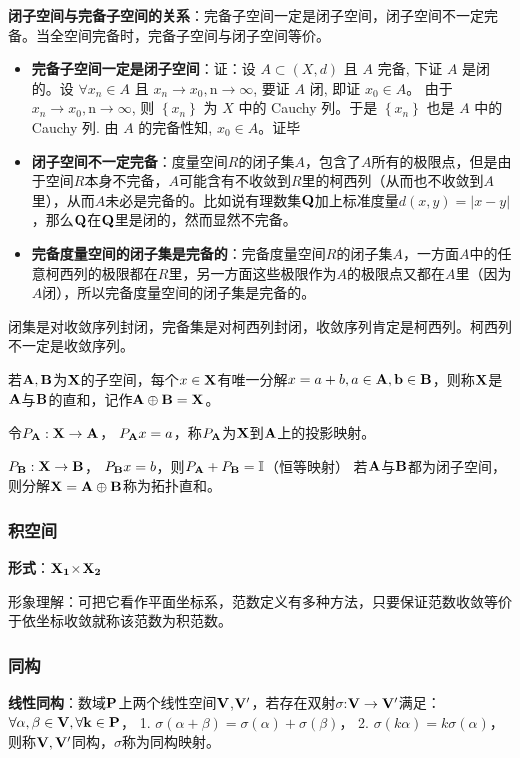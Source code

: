 \documentclass[12pt,a4paper]{article}
\begin{document}
\textbf{闭子空间与完备子空间的关系}：完备子空间一定是闭子空间，闭子空间不一定完备。当全空间完备时，完备子空间与闭子空间等价。
\begin{itemize}
  \item \textbf{完备子空间一定是闭子空间}：证：设 $A \subset(X, d)$ 且 $A$ 完备, 下证 $A$ 是闭的。设 $\forall x_{n} \in A$ 且 $x_{n} \rightarrow x_{0}, \mathrm{n} \rightarrow \infty$, 要证 $A$ 闭, 即证 $x_{0} \in A$。 由于 $x_{n} \rightarrow x_{0}, \mathrm{n} \rightarrow \infty$, 则 $\left\{x_{n}\right\}$ 为 $X$ 中的 Cauchy 列。于是 $\left\{x_{n}\right\}$ 也是 $A$ 中的 Cauchy 列. 由 $A$ 的完备性知, $x_{0} \in A$。证毕
  \item \textbf{闭子空间不一定完备}：度量空间$R$的闭子集$A$，包含了$A$所有的极限点，但是由于空间$R$本身不完备，$A$可能含有不收敛到$R$里的柯西列（从而也不收敛到$A$里），从而$A$未必是完备的。比如说有理数集$\bf{Q}$加上标准度量$d(x,y)=|x-y|$，那么$\bf{Q}$在$\bf{Q}$里是闭的，然而显然不完备。
  \item \textbf{完备度量空间的闭子集是完备的}：完备度量空间$R$的闭子集$A$，一方面$A$中的任意柯西列的极限都在$R$里，另一方面这些极限作为$A$的极限点又都在$A$里（因为$A$闭），所以完备度量空间的闭子集是完备的。
\end{itemize}
闭集是对收敛序列封闭，完备集是对柯西列封闭，收敛序列肯定是柯西列。柯西列不一定是收敛序列。

若$\bf{A},\bf{B}$为$\bf{X}$的子空间，每个$x\in{\bf{X}}$有唯一分解$x=a+b,a\in\bf{A},b\in{\bf{B}}$，则称$\bf{X}$是$\bf{A}$与$\bf{B}$的直和，记作$\bf{A}\oplus \bf{B}=\bf{X}$。

令$P_{\bf{A}}:\bf{X}\rightarrow \bf{A}$， $P_{\bf{A}}x=a$，称$P_{\bf{A}}$为$\bf{X}$到$\bf{A}$上的投影映射。

$P_{\bf{B}}:\bf{X}\rightarrow \bf{B}$， $P_{\bf{B}}x=b$，则$P_{\bf{A}}+P_{\bf{B}}=\mathbb{I}$（恒等映射）
若$\bf{A}$与$\bf{B}$都为闭子空间，则分解$\bf{X}=\bf{A}\oplus\bf{B}$称为拓扑直和。

\subsubsection{积空间}
\textbf{形式}：$\bf{X_1}$$\times$$\bf{X_2}$

形象理解：可把它看作平面坐标系，范数定义有多种方法，只要保证范数收敛等价于依坐标收敛就称该范数为积范数。

\subsubsection{同构}
\textbf{线性同构}：数域$\bf{P}$上两个线性空间$\bf{V}$,$\bf{V'}$，若存在双射$\sigma$:$\bf{V}\to \bf{V'}$满足：
$\forall \alpha,\beta\in \bf{V},\forall k\in \bf{P}$，
1. $\sigma(\alpha+\beta)=\sigma(\alpha)+\sigma(\beta)$，
2. $\sigma(k\alpha)=k\sigma(\alpha)​$，则称$\bf{V},\bf{V'}$同构，$\sigma$称为同构映射。
\end{document}
